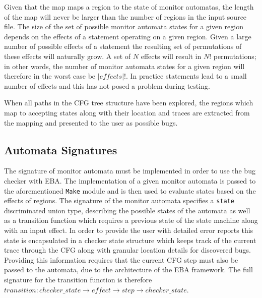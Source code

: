 \newpar Given that the map maps a region to the state of monitor automatas, the length of the map will never be larger than the number of regions in the input source file. The size of the set of possible monitor automata states for a given region depends on the effects of a statement operating on a given region. Given a large number of possible effects of a statement the resulting set of permutations of these effects will naturally grow. A set of $N$ effects will result in $N!$ permutations; in other words, the number of monitor automata states for a given region will therefore in the worst case be $|effects|!$. In practice statements lead to a small number of effects and this has not posed a problem during testing.

\newpar When all paths in the CFG tree structure have been explored, the regions which map to accepting states along with their location and traces are extracted from the mapping and presented to the user as possible bugs. 

\subsection{Automata Signatures}

The signature of monitor automata must be implemented in order to use the bug checker with EBA. The implementation of a given monitor automata is passed to the aforementioned \texttt{Make} module and is then used to evaluate states based on the effects of regions. The signature of the monitor automata specifies a \texttt{state} discriminated union type, describing the possible states of the automata as well as a transition function which requires a previous state of the state machine along with an input effect. In order to provide the user with detailed error reports this state is encapsulated in a checker state structure which keeps track of the current trace through the CFG along with granular location details for discovered bugs. Providing this information requires that the current CFG step must also be passed to the automata, due to the architecture of the EBA framework. The full signature for the transition function is therefore $transition: \mathit{checker\_state} \rightarrow \mathit{effect} \rightarrow \mathit{step} \rightarrow \mathit{checker\_state}$. 